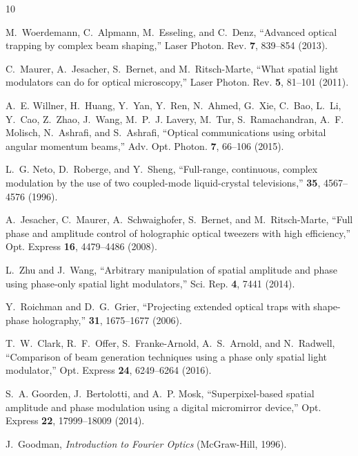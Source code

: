 \documentclass[amsmath,onecolumn,superscriptaddress,notitlepage]{revtex4-1}
\begin{document}
\begin{thebibliography}{10}
\newcommand{\enquote}[1]{``#1''}

M.~Woerdemann, C.~Alpmann, M.~Esseling, and C.~Denz, \enquote{Advanced optical
  trapping by complex beam shaping,} Laser Photon. Rev. \textbf{7}, 839--854
  (2013).

C.~Maurer, A.~Jesacher, S.~Bernet, and M.~Ritsch-Marte, \enquote{What spatial
  light modulators can do for optical microscopy,} Laser Photon. Rev.
  \textbf{5}, 81--101 (2011).

A.~E. Willner, H.~Huang, Y.~Yan, Y.~Ren, N.~Ahmed, G.~Xie, C.~Bao, L.~Li,
  Y.~Cao, Z.~Zhao, J.~Wang, M.~P.~J. Lavery, M.~Tur, S.~Ramachandran, A.~F.
  Molisch, N.~Ashrafi, and S.~Ashrafi, \enquote{Optical communications using
  orbital angular momentum beams,} Adv. Opt. Photon. \textbf{7}, 66--106
  (2015).

L.~G. Neto, D.~Roberge, and Y.~Sheng, \enquote{Full-range, continuous, complex
  modulation by the use of two coupled-mode liquid-crystal televisions,} \ao \textbf{35}, 4567--4576 (1996).

A.~Jesacher, C.~Maurer, A.~Schwaighofer, S.~Bernet, and M.~Ritsch-Marte,
  \enquote{Full phase and amplitude control of holographic optical tweezers
  with high efficiency,} Opt. Express \textbf{16}, 4479--4486 (2008).

L.~Zhu and J.~Wang, \enquote{Arbitrary manipulation of spatial amplitude and
  phase using phase-only spatial light modulators,} Sci. Rep. \textbf{4}, 7441
  (2014).
  
Y.~Roichman and D.~G.~Grier, \enquote{Projecting extended optical traps with shape-phase holography,} \ol \textbf{31}, 1675--1677 (2006).

T.~W.~Clark, R.~F.~Offer, S.~Franke-Arnold, A.~S.~Arnold, and N.~Radwell, \enquote{Comparison of beam generation techniques using a phase only spatial light modulator,} Opt. Express \textbf{24}, 6249--6264 (2016).

S.~A. Goorden, J.~Bertolotti, and A.~P. Mosk, \enquote{Superpixel-based spatial
  amplitude and phase modulation using a digital micromirror device,} Opt. Express
  \textbf{22}, 17999--18009 (2014).

J.~Goodman, \emph{Introduction to Fourier Optics} (McGraw-Hill, 1996).


\end{thebibliography}
\end{document}
